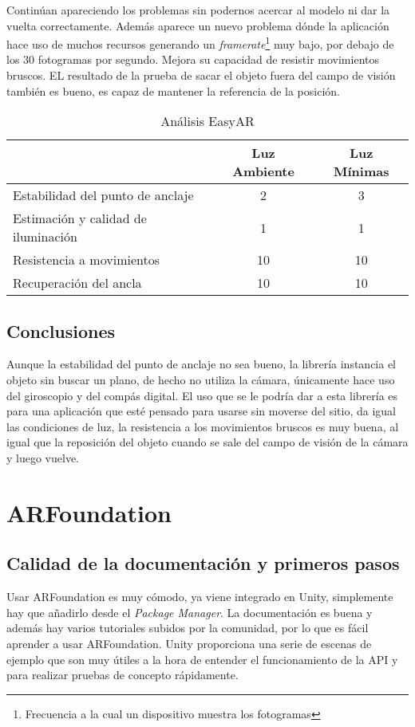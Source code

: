 Continúan apareciendo los problemas sin podernos acercar al modelo ni dar la vuelta correctamente. Además aparece un nuevo problema dónde la aplicación hace uso de muchos recursos generando un \textit{framerate}\footnote{Frecuencia a la cual un dispositivo muestra los fotogramas} muy bajo, por debajo de los 30 fotogramas por segundo. Mejora su capacidad de resistir movimientos bruscos. EL resultado de la prueba de sacar el objeto fuera del campo de visión también es bueno, es capaz de mantener la referencia de la posición.

\begin{table}[H]
    \centering
    \begin{tabular}{|l|c|c|}
    \hline
          & Luz Ambiente & Luz Mínimas \\
         \hline
        Estabilidad del punto de anclaje   &2 &3\\
        \hline
        Estimación y calidad de iluminación  &1 &1 \\
        \hline
        Resistencia a movimientos  &10 &10 \\
        \hline
        Recuperación del ancla  &10 &10 \\
      \hline
    \end{tabular}
    \caption{Análisis EasyAR}
    \label{tab:EasyAR}
\end{table}
\subsection{Conclusiones}
Aunque la estabilidad del punto de anclaje no sea bueno, la librería instancia el objeto sin buscar un plano, de hecho no utiliza la cámara, únicamente hace uso del giroscopio y del compás digital. El uso que se le podría dar a esta librería es para una aplicación que esté pensado para usarse sin moverse del sitio, da igual las condiciones de luz, la resistencia a los movimientos bruscos es muy buena, al igual que la reposición del objeto cuando se sale del campo de visión de la cámara y luego vuelve.

\clearpage
\section{ARFoundation}
\subsection{Calidad de la documentación y primeros pasos}
Usar ARFoundation es muy cómodo, ya viene integrado en Unity, simplemente hay que añadirlo desde el \textit{Package Manager}. La documentación es buena y además hay varios tutoriales subidos por la comunidad, por lo que es fácil aprender a usar ARFoundation. Unity proporciona una serie de escenas de ejemplo que son muy útiles a la hora de entender el funcionamiento de la API y para realizar pruebas de concepto rápidamente\cite{UnityGithub}.


